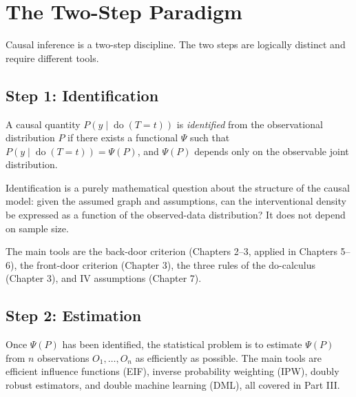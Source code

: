 \documentclass[
  a4paper,
]{book}
\newcommand{\doop}{\operatorname{do}}
\begin{document}
\section{The Two-Step Paradigm}\label{sec-two-step}

Causal inference is a two-step discipline. The two steps are logically
distinct and require different tools.

\subsection{Step 1: Identification}\label{step-1-identification}

\begin{tcolorbox}[enhanced jigsaw, arc=.35mm, bottomrule=.15mm, bottomtitle=1mm, breakable, colback=white, colbacktitle=quarto-callout-note-color!10!white, colframe=quarto-callout-note-color-frame, coltitle=black, left=2mm, leftrule=.75mm, opacityback=0, opacitybacktitle=0.6, rightrule=.15mm, title={Definition: Identification}, titlerule=0mm, toprule=.15mm, toptitle=1mm]

A causal quantity \(P(y \mid \doop(T{=}t))\) is \emph{identified} from
the observational distribution \(P\) if there exists a functional
\(\Psi\) such that \(P(y \mid \doop(T{=}t)) = \Psi(P)\), and \(\Psi(P)\)
depends only on the observable joint distribution.

\end{tcolorbox}

Identification is a purely mathematical question about the structure of
the causal model: given the assumed graph and assumptions, can the
interventional density be expressed as a function of the observed-data
distribution? It does not depend on sample size.

The main tools are the back-door criterion (Chapters 2--3, applied in
Chapters 5--6), the front-door criterion (Chapter 3), the three rules of
the do-calculus (Chapter 3), and IV assumptions (Chapter 7).

\subsection{Step 2: Estimation}\label{step-2-estimation}

Once \(\Psi(P)\) has been identified, the statistical problem is to
estimate \(\Psi(P)\) from \(n\) observations \(O_1,\dots,O_n\) as
efficiently as possible. The main tools are efficient influence
functions (EIF), inverse probability weighting (IPW), doubly robust
estimators, and double machine learning (DML), all covered in Part III.
\end{document}
